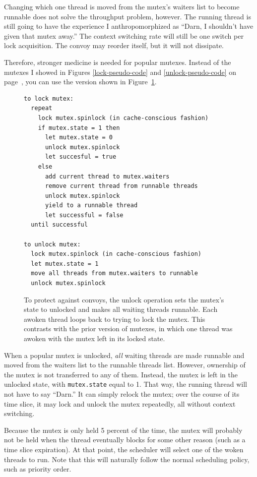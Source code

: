 Changing which one thread is moved from the mutex's waiters list to
become runnable does not solve the throughput problem, however.  The
running thread is still going to have the experience I
anthropomorphized as ``Darn, I shouldn't have given that mutex away.''
The context switching rate will still be one switch per lock
acquisition.  The convoy may reorder itself, but it will not
dissipate.

Therefore, stronger medicine is needed for popular mutexes.  Instead
of the mutexes I showed in Figures \ref{lock-pseudo-code} and
\ref{unlock-pseudo-code} on page~\pageref{lock-pseudo-code}, you can
use the version shown in Figure~\ref{convoy-pseudo-code}.
\begin{figure}
\begin{verbatim}
to lock mutex:
  repeat
    lock mutex.spinlock (in cache-conscious fashion)
    if mutex.state = 1 then
      let mutex.state = 0
      unlock mutex.spinlock
      let succesful = true
    else
      add current thread to mutex.waiters
      remove current thread from runnable threads
      unlock mutex.spinlock
      yield to a runnable thread
      let successful = false
  until successful

to unlock mutex:
  lock mutex.spinlock (in cache-conscious fashion)
  let mutex.state = 1
  move all threads from mutex.waiters to runnable
  unlock mutex.spinlock
\end{verbatim}
\caption{To protect against convoys, the unlock operation sets the
  mutex's state to unlocked and makes all waiting threads runnable.
  Each awoken thread loops back to trying to lock the mutex.  This
  contrasts with the prior version of mutexes, in which one thread
  was awoken with the mutex left in its locked state.}
\label{convoy-pseudo-code}
\end{figure}

When a popular mutex is unlocked, {\em all} waiting threads are made
runnable and moved from the waiters list to the runnable threads list.
However, ownership of the mutex is not transferred to any of them.
Instead, the mutex is left in the unlocked state, with \verb|mutex.state| equal to 1.  That way, the
running thread will not have to say ``Darn.''  It can simply relock
the mutex; over the course of its time slice, it may lock and unlock
the mutex repeatedly, all without context switching.

Because the mutex is only held 5 percent of the time, the
mutex will probably not be held when the thread eventually blocks for
some other reason (such as a time slice expiration).  At that point, the
scheduler will select one of the woken threads to run.  Note that this
will naturally follow the normal scheduling policy, such as priority
order.

